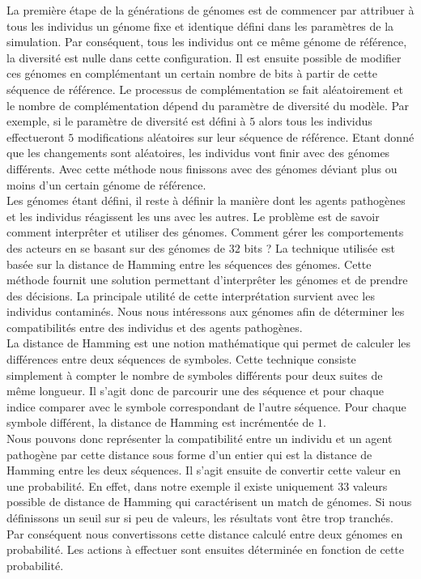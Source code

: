 La première étape de la générations de génomes est de commencer par attribuer à tous les individus un génome fixe et identique défini dans les paramètres de la simulation. Par conséquent, tous les individus ont ce même génome de référence, la diversité est nulle dans cette configuration. Il est ensuite possible de modifier ces génomes en complémentant un certain nombre de bits à partir de cette séquence de référence. Le processus de complémentation se fait aléatoirement et le nombre de complémentation dépend du paramètre de diversité du modèle. Par exemple, si le paramètre de diversité est défini à $5$ alors tous les individus effectueront $5$ modifications aléatoires sur leur séquence de référence. Etant donné que les changements sont aléatoires, les individus vont finir avec des génomes différents. Avec cette méthode nous finissons avec des génomes déviant plus ou moins d'un certain génome de référence.\\

Les génomes étant défini, il reste à définir la manière dont les agents pathogènes et les individus réagissent les uns avec les autres. Le problème est de savoir comment interprêter et utiliser des génomes. Comment gérer les comportements des acteurs en se basant sur des génomes de $32$ bits ? La technique utilisée est basée sur la distance de Hamming entre les séquences des génomes. Cette méthode fournit une solution permettant d'interprêter les génomes et de prendre des décisions. La principale utilité de cette interprétation survient avec les individus contaminés. Nous nous intéressons aux génomes afin de déterminer les compatibilités entre des individus et des agents pathogènes.\\

La distance de Hamming est une notion mathématique qui permet de calculer les différences entre deux séquences de symboles. Cette technique consiste simplement à compter le nombre de symboles différents pour deux suites de même longueur. Il s'agit donc de parcourir une des séquence et pour chaque indice comparer avec le symbole correspondant de l'autre séquence. Pour chaque symbole différent, la distance de Hamming est incrémentée de $1$.\\

Nous pouvons donc représenter la compatibilité entre un individu et un agent pathogène par cette distance sous forme d'un entier qui est la distance de Hamming entre les deux séquences. Il s'agit ensuite de convertir cette valeur en une probabilité. En effet, dans notre exemple il existe uniquement $33$ valeurs possible de distance de Hamming qui caractérisent un match de génomes. Si nous définissons un seuil sur si peu de valeurs, les résultats vont être trop tranchés. Par conséquent nous convertissons cette distance calculé entre deux génomes en probabilité. Les actions à effectuer sont ensuites déterminée en fonction de cette probabilité.\\

